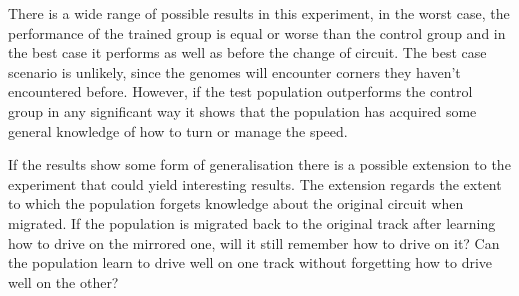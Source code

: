 
There is a wide range of possible results in this experiment, in the worst case, the performance of the trained group is equal or worse than the control group and in the best case it performs as well as before the change of circuit. The best case scenario is unlikely, since the genomes will encounter corners they haven't encountered before. However, if the test population outperforms the control group in any significant way it shows that the population has acquired some general knowledge of how to turn or manage the speed. 

If the results show some form of generalisation there is a possible extension to the experiment that could yield interesting results. The extension regards the extent to which the population forgets knowledge about the original circuit when migrated. If the population is migrated back to the original track after learning how to drive on the mirrored one, will it still remember how to drive on it? Can the population learn to drive well on one track without forgetting how to drive well on the other?


